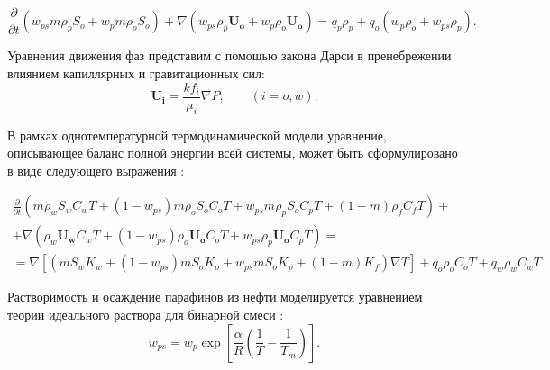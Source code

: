 \documentclass[12pt,twoside,a4paper]{uz_ku}
\begin{document}
\begin{equation}\label{eq3}
\frac{\partial}{\partial t}(w_{ps} m \rho_p S_o + w_p  m \rho_o S_o) + \nabla(w_{ps}  \rho_p \mathbf{U_o} + w_p \rho_o \mathbf{U_o}) = q_p \rho_p + q_o (w_p \rho_o + w_{ps} \rho_p).
\end{equation}

	Уравнения движения фаз представим с помощью закона Дарси в пренебрежении влиянием капиллярных и гравитационных сил:
\begin{equation}\label{eq4}
\mathbf{U_i} = \frac{k f_i}{\mu_i} \nabla P,  \qquad (i=o,w).
\end{equation}

	В рамках однотемпературной термодинамической модели  уравнение, описывающее баланс полной энергии всей системы, может быть сформулировано в виде следующего выражения \cite{3}:

\begin{multline}\label{eq5}
\frac{\partial }
{\partial t}(m \rho_w S_w C_w T +(1-w_{ps})m \rho_o S_o C_o T + 
w_{ps}m \rho_p S_o C_p T +(1-m) \rho_f C_f T) + 
\\
+\nabla(\rho_w \mathbf{U_w} C_w T + (1-w_{ps}) \rho_o \mathbf{U_o} C_o T + w_{ps}\rho_p \mathbf{U_o} C_p T) = 
\\
=\nabla [(m S_w K_w + (1-w_{ps}) m S_o K_o  + w_{ps} m S_o K_p + (1-m) K_f) \nabla T ] + q_o \rho_o C_o T + q_w \rho_w C_w T
\end{multline}

Растворимость и осаждение парафинов из нефти моделируется уравнением теории идеального раствора для бинарной смеси \cite{3}:
\begin{equation} \label{eq6}
w_{ps} = w_p \exp[\frac{\alpha}{R}(\frac{1}{T} - \frac{1}{T_m})]. 
\end{equation}
\end{document}
